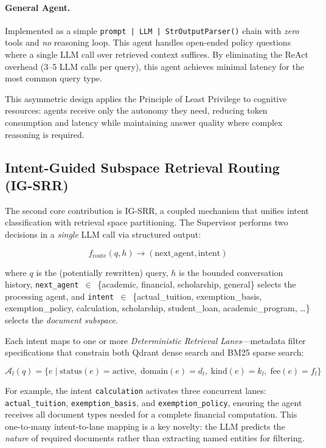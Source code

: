 \documentclass[runningheads]{llncs}
\begin{document}
\paragraph{General Agent.} Implemented as a simple \texttt{prompt | LLM | StrOutputParser()} chain with \emph{zero} tools and \emph{no} reasoning loop. This agent handles open-ended policy questions where a single LLM call over retrieved context suffices. By eliminating the ReAct overhead (3--5 LLM calls per query), this agent achieves minimal latency for the most common query type.

This asymmetric design applies the Principle of Least Privilege to cognitive resources: agents receive only the autonomy they need, reducing token consumption and latency while maintaining answer quality where complex reasoning is required.

\subsection{Intent-Guided Subspace Retrieval Routing (IG-SRR)}
\label{sec:igssr}

The second core contribution is IG-SRR, a coupled mechanism that unifies intent classification with retrieval space partitioning. The Supervisor performs two decisions in a \emph{single} LLM call via structured output:

\begin{equation}
    f_{\text{route}}(q, h) \to (\text{next\_agent}, \text{intent})
    \label{eq:route}
\end{equation}

where $q$ is the (potentially rewritten) query, $h$ is the bounded conversation history, \texttt{next\_agent}~$\in$~\{academic, financial, scholarship, general\} selects the processing agent, and \texttt{intent}~$\in$~\{actual\_tuition, exemption\_basis, exemption\_policy, calculation, scholarship, student\_loan, academic\_program, \ldots\} selects the \emph{document subspace}.

Each intent maps to one or more \emph{Deterministic Retrieval Lanes}---metadata filter specifications that constrain both Qdrant dense search and BM25 sparse search:

\begin{equation}
    \mathcal{A}_l(q) = \{e \mid \text{status}(e) = \text{active},\; \text{domain}(e) = d_l,\; \text{kind}(e) = k_l,\; \text{fee}(e) = f_l\}
    \label{eq:lane}
\end{equation}

For example, the intent \texttt{calculation} activates three concurrent lanes: \texttt{actual\_tuition}, \texttt{exemption\_basis}, and \texttt{exemption\_policy}, ensuring the agent receives all document types needed for a complete financial computation. This one-to-many intent-to-lane mapping is a key novelty: the LLM predicts the \emph{nature} of required documents rather than extracting named entities for filtering.
\end{document}
